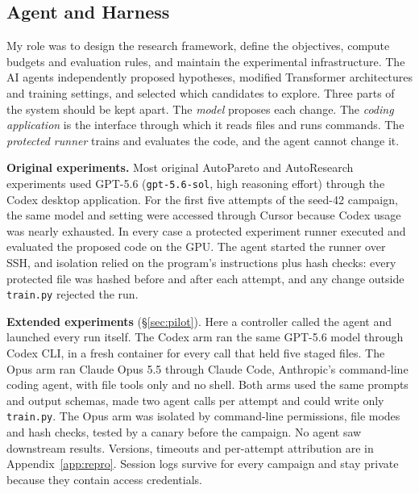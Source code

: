 \documentclass{article}
\newif\ifshowhumanmarkers \showhumanmarkersfalse
\newcommand{\humantag}[1]{{\color{humanframe}\sffamily\scriptsize\bfseries HUMAN AUTHOR MUST REWRITE/VERIFY [#1]}\ }
\newcommand{\humanauthor}[2][]{\ifshowhumanmarkers\begin{humanbox}\humantag{#1}#2\end{humanbox}\else #2\par\fi}
\begin{document}
\subsection{Agent and Harness}\label{sec:agent}
\humanauthor[P2-02 r6]{ My role was to design the research framework, define the objectives, compute budgets and evaluation rules, and maintain the experimental infrastructure. The AI agents independently proposed hypotheses, modified Transformer architectures and training settings, and selected which candidates to explore. Three parts of the system should be kept apart. The \emph{model} proposes each change. The \emph{coding application} is the interface through which it reads files and runs commands. The \emph{protected runner} trains and evaluates the code, and the agent cannot change it.

\looseness=-1 \textbf{Original experiments.} Most original AutoPareto and AutoResearch experiments used GPT-5.6 (\texttt{gpt-5.6-sol}, high reasoning effort) through the Codex desktop application. For the first five attempts of the seed-42 campaign, the same model and setting were accessed through Cursor because Codex usage was nearly exhausted. In every case a protected experiment runner executed and evaluated the proposed code on the GPU. The agent started the runner over SSH, and isolation relied on the program's instructions plus hash checks: every protected file was hashed before and after each attempt, and any change outside \texttt{train.py} rejected the run.

\looseness=-1 \textbf{Extended experiments} (\S\ref{sec:pilot}). Here a controller called the agent and launched every run itself. The Codex arm ran the same GPT-5.6 model through Codex CLI, in a fresh container for every call that held five staged files. The Opus arm ran Claude Opus 5.5 through Claude Code, Anthropic's command-line coding agent, with file tools only and no shell. Both arms used the same prompts and output schemas, made two agent calls per attempt and could write only \texttt{train.py}. The Opus arm was isolated by command-line permissions, file modes and hash checks, tested by a canary before the campaign. No agent saw downstream results. Versions, timeouts and per-attempt attribution are in Appendix~\ref{app:repro}. Session logs survive for every campaign and stay private because they contain access credentials.}
\end{document}
